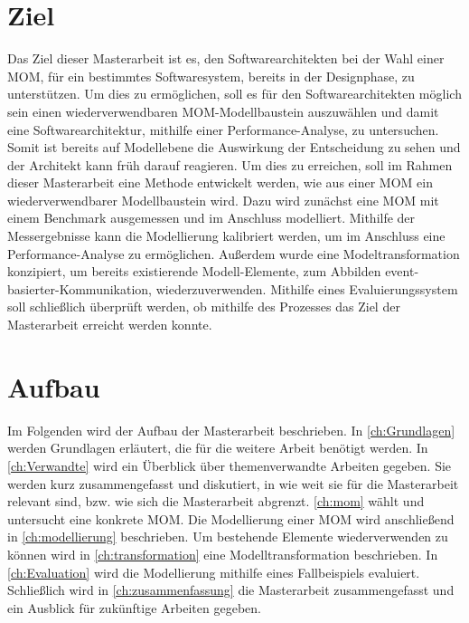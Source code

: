 \section{Ziel}
Das Ziel dieser Masterarbeit ist es, den Softwarearchitekten bei der Wahl einer MOM, für ein bestimmtes  Softwaresystem, bereits in der Designphase, zu unterstützen. Um dies zu ermöglichen, soll es für den Softwarearchitekten möglich sein einen wiederverwendbaren MOM-Modellbaustein auszuwählen und damit eine Softwarearchitektur, mithilfe einer Performance-Analyse, zu untersuchen. Somit ist bereits auf Modellebene die Auswirkung der Entscheidung zu sehen und der Architekt kann früh darauf reagieren. Um dies zu erreichen, soll im Rahmen dieser Masterarbeit eine Methode entwickelt werden, wie aus einer MOM ein wiederverwendbarer Modellbaustein wird. Dazu wird zunächst eine MOM mit einem Benchmark ausgemessen und im Anschluss modelliert. Mithilfe der Messergebnisse kann die Modellierung kalibriert werden, um im Anschluss eine Performance-Analyse zu ermöglichen. Außerdem wurde eine Modeltransformation konzipiert, um bereits existierende Modell-Elemente, zum Abbilden event-basierter-Kommunikation, wiederzuverwenden. Mithilfe eines Evaluierungssystem soll schließlich überprüft werden, ob mithilfe des Prozesses das Ziel der Masterarbeit erreicht werden konnte.

\section{Aufbau}
Im Folgenden wird der Aufbau der Masterarbeit beschrieben. In \autoref{ch:Grundlagen} werden Grundlagen erläutert, die für die weitere Arbeit benötigt werden. In \autoref{ch:Verwandte} wird ein Überblick über themenverwandte Arbeiten gegeben. Sie werden kurz zusammengefasst und diskutiert, in
wie weit sie für die Masterarbeit relevant sind, bzw. wie sich die Masterarbeit abgrenzt. \autoref{ch:mom} wählt und untersucht eine konkrete MOM. Die Modellierung einer MOM wird anschließend in \autoref{ch:modellierung} beschrieben. Um bestehende Elemente wiederverwenden zu können wird in \autoref{ch:transformation} eine Modelltransformation beschrieben. In \autoref{ch:Evaluation} wird die Modellierung mithilfe eines Fallbeispiels evaluiert. Schließlich wird in \autoref{ch:zusammenfassung} die Masterarbeit zusammengefasst und ein Ausblick für zukünftige Arbeiten gegeben.


